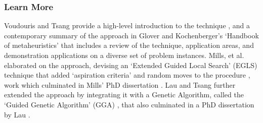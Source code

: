 % 
% 
\subsubsection{Learn More}
Voudouris and Tsang provide a high-level introduction to the technique \cite{Voudouris1998}, and a contemporary summary of the approach in Glover and Kochenberger's `Handbook of metaheuristics' \cite{Glover2003a} that includes a review of the technique, application areas, and demonstration applications on a diverse set of problem instances.
Mills, et al. elaborated on the approach, devising an `Extended Guided Local Search' (EGLS) technique that added `aspiration criteria' and random moves to the procedure \cite{Mills2003}, work which culminated in Mills' PhD dissertation \cite{Mills2002}.  
Lau and Tsang further extended the approach by integrating it with a Genetic Algorithm, called the `Guided Genetic Algorithm' (GGA) \cite{Lau1998}, that also culminated in a PhD dissertation by Lau \cite{Lau1999}.


